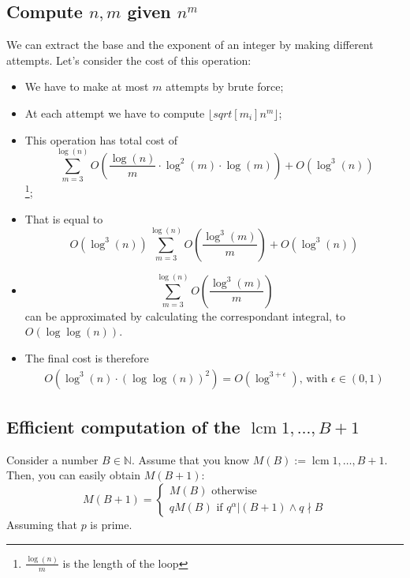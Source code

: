 \subsection{Compute $n, m$ given $n^{m}$}
We can extract the base and the exponent of an integer by making different attempts.\newline
Let's consider the cost of this operation:
\begin{itemize}
    \item We have to make at most $m$ attempts by brute force;
    \item At each attempt we have to compute $\lfloor sqrt[m_{i}]{n^{m}} \rfloor$;
    \item This operation has total cost of \[\sum_{m=3}^{\operatorname{log}(n)} O(\frac{\operatorname{log}(n)}{m} \cdot \operatorname{log}^{2}(m) \cdot \operatorname{log}(m)) + O(\operatorname{log}^{3}(n))\]\footnote{$\frac{\operatorname{log}(n)}{m}$ is the length of the loop};
    \item That is equal to \[O(\operatorname{log}^{3}(n)) \sum_{m=3}^{\operatorname{log}(n)} O(\frac{\operatorname{log}^{3}(m)}{m}) + O(\operatorname{log}^{3}(n))\]
    \item \[\sum_{m=3}^{\operatorname{log}(n)} O(\frac{\operatorname{log}^{3}(m)}{m})\] can be approximated by calculating the correspondant integral, to $O(\operatorname{log}\operatorname{log}(n))$.
    \item The final cost is therefore
    \begin{align*}
        O(\operatorname{log}^{3}(n) \cdot(\operatorname{log}\operatorname{log}(n))^{2})
        = O(\operatorname{log}^{3 + \epsilon}) \text{, with } \epsilon \in (0,1)
    \end{align*}
\end{itemize}

\subsection{Efficient computation of the $\operatorname{lcm}{1, \dots, B + 1}$}
Consider a number $B \in \mathbb{N}$. Assume that you know $M(B) := \operatorname{lcm}{1, \dots, B + 1}$. Then, you can easily obtain $M(B+1)$:
\[
M(B + 1) =
     \begin{cases}
       M(B) \text{ otherwise } \\
       q M(B) \text{ if } q^{\alpha}|(B+1) \land q \nmid B
     \end{cases}
\]
Assuming that $p$ is prime.
